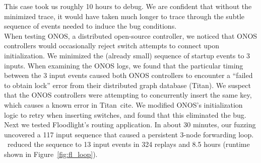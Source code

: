 This case took us roughly 10 hours to debug. We are confident that without the
minimized trace, it would have taken much
longer to trace through the subtle sequence of events needed to induce the bug
conditions.\\[0.5ex]
 When testing ONOS, a
distributed open-source controller, we noticed that ONOS controllers would
occasionally reject switch attempts to connect upon initialization.
We minimized the (already small) sequence of startup events to 3 inputs.
When examining the ONOS logs, we found that the particular timing between the 3
input events caused both ONOS controllers to encounter a ``failed to obtain
lock'' error from their distributed graph database (Titan). We suspect that the ONOS controllers
were attempting to concurrently insert the same key, which causes a known
error in Titan~\num{cite}.
We modified ONOS's initialization logic to retry when inserting switches,
and found that this eliminated the bug.\\[0.5ex]
 Next we
tested Floodlight's routing application.
In about 30 minutes, our fuzzing uncovered a
117 input sequence that caused a persistent 3-node forwarding loop.
\projectname~reduced the sequence to 13 input events in 324 replays and 8.5
hours (runtime shown in Figure~\ref{fig:fl_loop}).

